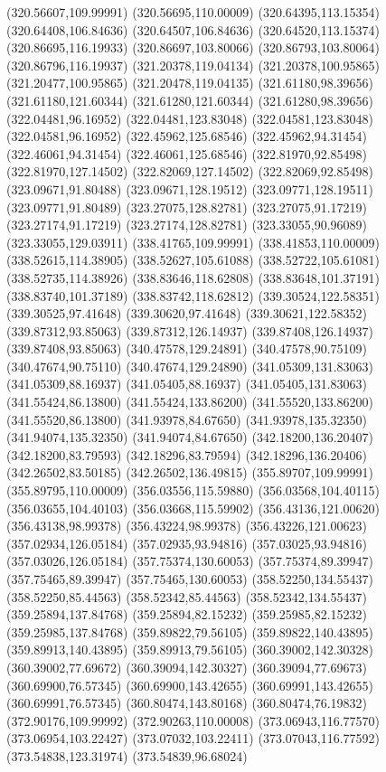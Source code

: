 {(320.56607,109.99991) (320.56695,110.00009) (320.64395,113.15354) (320.64408,106.84636) (320.64507,106.84636) (320.64520,113.15374) (320.86695,116.19933) (320.86697,103.80066)
(320.86793,103.80064) (320.86796,116.19937) (321.20378,119.04134) (321.20378,100.95865) (321.20477,100.95865) (321.20478,119.04135) (321.61180,98.39656) (321.61180,121.60344)
(321.61280,121.60344) (321.61280,98.39656) (322.04481,96.16952) (322.04481,123.83048) (322.04581,123.83048) (322.04581,96.16952) (322.45962,125.68546) (322.45962,94.31454)
(322.46061,94.31454) (322.46061,125.68546) (322.81970,92.85498) (322.81970,127.14502) (322.82069,127.14502) (322.82069,92.85498) (323.09671,91.80488) (323.09671,128.19512)
(323.09771,128.19511) (323.09771,91.80489) (323.27075,128.82781) (323.27075,91.17219) (323.27174,91.17219) (323.27174,128.82781) (323.33055,90.96089) (323.33055,129.03911)
(338.41765,109.99991) (338.41853,110.00009) (338.52615,114.38905) (338.52627,105.61088) (338.52722,105.61081) (338.52735,114.38926) (338.83646,118.62808) (338.83648,101.37191)
(338.83740,101.37189) (338.83742,118.62812) (339.30524,122.58351) (339.30525,97.41648) (339.30620,97.41648) (339.30621,122.58352) (339.87312,93.85063) (339.87312,126.14937)
(339.87408,126.14937) (339.87408,93.85063) (340.47578,129.24891) (340.47578,90.75109) (340.47674,90.75110) (340.47674,129.24890) (341.05309,131.83063) (341.05309,88.16937)
(341.05405,88.16937) (341.05405,131.83063) (341.55424,86.13800) (341.55424,133.86200) (341.55520,133.86200) (341.55520,86.13800) (341.93978,84.67650) (341.93978,135.32350)
(341.94074,135.32350) (341.94074,84.67650) (342.18200,136.20407) (342.18200,83.79593) (342.18296,83.79594) (342.18296,136.20406) (342.26502,83.50185) (342.26502,136.49815)
(355.89707,109.99991) (355.89795,110.00009) (356.03556,115.59880) (356.03568,104.40115) (356.03655,104.40103) (356.03668,115.59902) (356.43136,121.00620) (356.43138,98.99378)
(356.43224,98.99378) (356.43226,121.00623) (357.02934,126.05184) (357.02935,93.94816) (357.03025,93.94816) (357.03026,126.05184) (357.75374,130.60053) (357.75374,89.39947)
(357.75465,89.39947) (357.75465,130.60053) (358.52250,134.55437) (358.52250,85.44563) (358.52342,85.44563) (358.52342,134.55437) (359.25894,137.84768) (359.25894,82.15232)
(359.25985,82.15232) (359.25985,137.84768) (359.89822,79.56105) (359.89822,140.43895) (359.89913,140.43895) (359.89913,79.56105) (360.39002,142.30328) (360.39002,77.69672)
(360.39094,142.30327) (360.39094,77.69673) (360.69900,76.57345) (360.69900,143.42655) (360.69991,143.42655) (360.69991,76.57345) (360.80474,143.80168) (360.80474,76.19832)
(372.90176,109.99992) (372.90263,110.00008) (373.06943,116.77570) (373.06954,103.22427) (373.07032,103.22411) (373.07043,116.77592) (373.54838,123.31974) (373.54839,96.68024)
}
